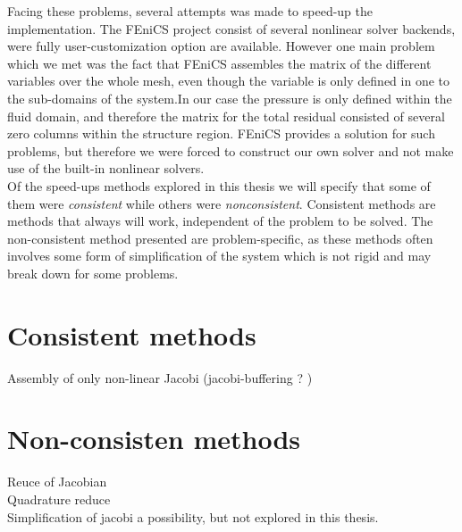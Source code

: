 Facing these problems, several attempts was made to speed-up the implementation. The FEniCS project consist of several nonlinear solver backends, were fully user-customization option are available. However one main problem which we met was the fact that FEniCS assembles the matrix of the different variables over the whole mesh, even though the variable is only defined in one to the sub-domains of the system.In our case the pressure is only defined within the fluid domain, and therefore the matrix for the total residual consisted of several zero columns within the structure region. FEniCS provides a solution for such problems, but therefore we were forced to construct our own solver and not make use of the built-in nonlinear solvers. \\

Of the speed-ups methods explored in this thesis we will specify that some of them were \textit{consistent} while others were \textit{nonconsistent}. Consistent methods are methods that always will work, independent of the problem to be solved. The non-consistent method presented are problem-specific, as these methods often involves some form of simplification of the system which is not rigid and may break down for some problems.

\section{Consistent methods}
Assembly of only non-linear Jacobi (jacobi-buffering ? )

\section{Non-consisten methods}    
Reuce of Jacobian \\
Quadrature reduce \\
Simplification of jacobi a possibility, but not explored in this thesis.

 




  